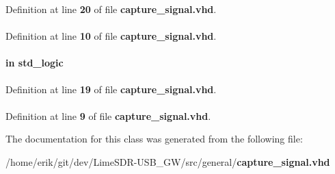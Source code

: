 Definition at line {\bf 20} of file {\bf capture\+\_\+signal.\+vhd}.

\paragraph[{numeric\+\_\+std}]{\hspace{0.3cm}{\ttfamily [Package]}}\label{classcapture__signal_a2edc34402b573437d5f25fa90ba4013e}


Definition at line {\bf 10} of file {\bf capture\+\_\+signal.\+vhd}.

\paragraph[{reset\+\_\+n}]{ {\bfseries \textcolor{keywordflow}{in}\textcolor{vhdlchar}{ }} {\bfseries \textcolor{comment}{std\+\_\+logic}\textcolor{vhdlchar}{ }} \hspace{0.3cm}{\ttfamily [Port]}}\label{classcapture__signal_a446ea52ed8c4a84181a47d9165ce41a5}


Definition at line {\bf 19} of file {\bf capture\+\_\+signal.\+vhd}.

\paragraph[{std\+\_\+logic\+\_\+1164}]{\hspace{0.3cm}{\ttfamily [Package]}}\label{classcapture__signal_acd03516902501cd1c7296a98e22c6fcb}


Definition at line {\bf 9} of file {\bf capture\+\_\+signal.\+vhd}.



The documentation for this class was generated from the following file\+:\begin{DoxyCompactItemize}
\item 
/home/erik/git/dev/\+Lime\+S\+D\+R-\/\+U\+S\+B\+\_\+\+G\+W/src/general/{\bf capture\+\_\+signal.\+vhd}\end{DoxyCompactItemize}
